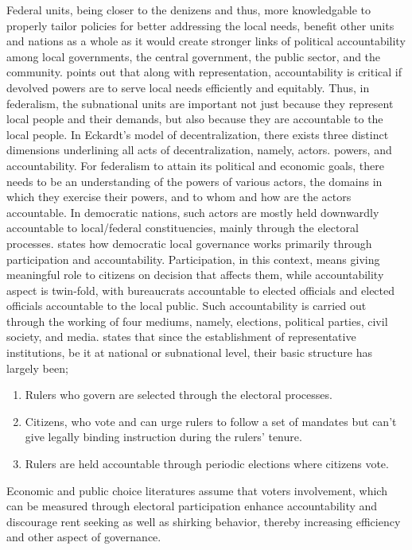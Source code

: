 Federal units, being closer to the denizens and thus, more knowledgable to properly tailor policies for better addressing the local needs, benefit other units and nations as a whole as it would create stronger links of political accountability among local governments, the central government,  the public sector, and the community\cite{Eckardt2008}.  points out that along with representation, accountability is critical if devolved powers are to serve local needs efficiently and equitably. Thus, in federalism, the subnational units are important not just because they represent local people and their demands, but also because they are accountable to the local people. In Eckardt's model of decentralization, there exists three distinct dimensions underlining all acts of decentralization, namely, actors. powers, and accountability. For federalism to attain its political and economic goals, there needs to be an understanding of the powers of various actors, the domains in which they exercise their powers, and to whom and how are the actors accountable. In democratic nations, such actors are mostly held downwardly accountable to local/federal constituencies, mainly through the electoral processes.  states how democratic local governance works primarily through participation and accountability. Participation, in this context, means giving meaningful role to citizens on decision that affects them, while accountability aspect is twin-fold, with bureaucrats accountable to elected officials and elected officials accountable to the local public. Such accountability is carried out through the working of four mediums, namely, elections, political parties, civil society, and media.  states that since the establishment of representative institutions, be it at national or subnational level, their basic structure has largely been; 
\begin{enumerate}[label=\roman*.]
    \item Rulers who govern are selected through the electoral processes. 
    \item Citizens, who vote and can urge rulers to follow a set of mandates but can't give legally binding instruction during the rulers' tenure.
    \item Rulers are held accountable through periodic elections where citizens vote.
\end{enumerate}
Economic and public choice literatures assume that voters involvement, which can be measured through electoral participation enhance accountability and discourage rent seeking as well as shirking behavior, thereby increasing efficiency and other aspect of governance\cite{Stigler1972, Barro1973}. \par
